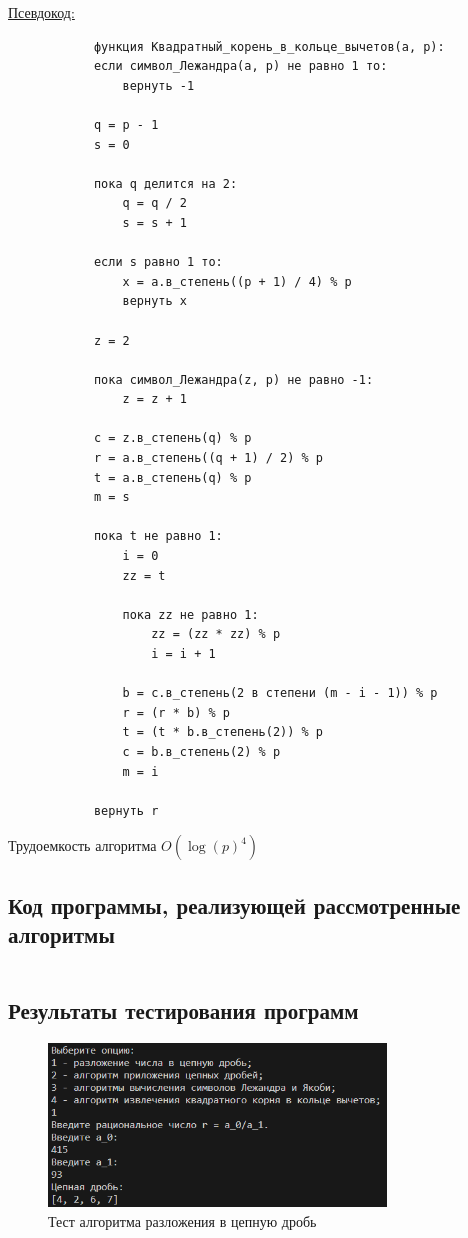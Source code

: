 \documentclass[bachelor, och, labwork]{shiza}
\begin{document}
            \underline{Псевдокод:}
            \begin{verbatim}
            функция Квадратный_корень_в_кольце_вычетов(a, p):
            если символ_Лежандра(a, p) не равно 1 то:
                вернуть -1
        
            q = p - 1
            s = 0
        
            пока q делится на 2:
                q = q / 2
                s = s + 1
        
            если s равно 1 то:
                x = a.в_степень((p + 1) / 4) % p
                вернуть x
        
            z = 2
        
            пока символ_Лежандра(z, p) не равно -1:
                z = z + 1
        
            c = z.в_степень(q) % p
            r = a.в_степень((q + 1) / 2) % p
            t = a.в_степень(q) % p
            m = s
        
            пока t не равно 1:
                i = 0
                zz = t
        
                пока zz не равно 1:
                    zz = (zz * zz) % p
                    i = i + 1
        
                b = c.в_степень(2 в степени (m - i - 1)) % p
                r = (r * b) % p
                t = (t * b.в_степень(2)) % p
                c = b.в_степень(2) % p
                m = i
        
            вернуть r
            \end{verbatim}

            Трудоемкость алгоритма $O(\log(p)^4)$\\
    
    \subsection{Код программы, реализующей рассмотренные алгоритмы}

        \inputminted[breaklines,fontsize=\small,linenos]{rust}{../code/src/main.rs}

    \subsection{Результаты тестирования программ}
        \begin{figure}[H]
            \centering
            \includegraphics[width=0.8\textwidth]{pic/1.png}
            \caption{Тест алгоритма разложения в цепную дробь}
        \end{figure}
\end{document}
